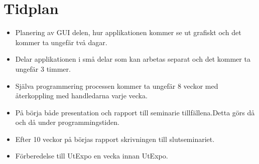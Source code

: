 \documentclass{article}
\begin{document}
\section{Tidplan} 
\begin{itemize}
    \item Planering av GUI delen, hur applikationen kommer se ut grafiskt och det kommer ta ungefär två dagar.
    \item Delar applikationen i små delar som kan arbetas separat och det kommer ta ungefär 3 timmer. 
    \item Själva programmering processen kommer ta ungefär 8 veckor med återkoppling med handledarna varje vecka.
    \item På börja både presentation och rapport till seminarie tillfällena.Detta görs då och då under programmingstiden. 
    \item Efter 10 veckor på börjas rapport skrivningen till slutseminariet.
    \item Förberedelse till UtExpo en vecka innan UtExpo.
\end{itemize}
\end{document}
